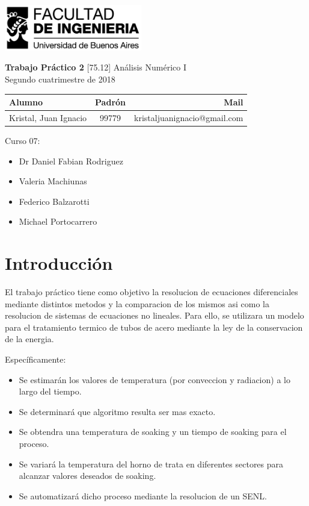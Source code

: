 \documentclass[11pt,a4paper]{article}
\begin{document}
\begin{titlepage}
	\hfill\includegraphics[width=6cm]{figuras/fiuba.jpg}
    \begin{center}
    \vfill
    \Huge \textbf{Trabajo Práctico 2}
    \vskip2cm
    \Large [75.12] Análisis Numérico I\\
    Segundo cuatrimestre de 2018
    \vfill
    \begin{tabular}{|l|c|r|}
	\hline
	Alumno & Padrón & Mail\\
	\hline
	\hline
	Kristal, Juan Ignacio & 99779 & kristaljuanignacio@gmail.com\\
	\hline
	\end{tabular}
    \vskip2cm
    \end{center}

    Curso 07:

    \begin{itemize}
    \item Dr Daniel Fabian Rodriguez
    \item Valeria Machiunas
    \item Federico Balzarotti
    \item Michael Portocarrero
    \end{itemize}

\end{titlepage}



\tableofcontents
\thispagestyle{onlyheader}
\newpage

\setcounter{page}{1}

\section{Introducción}
El trabajo práctico tiene como objetivo la resolucion de ecuaciones diferenciales mediante distintos metodos y la comparacion de los mismos asi como la resolucion de sistemas de ecuaciones no lineales. Para ello, se utilizara un modelo para el tratamiento termico de tubos de acero mediante la ley de la conservacion de la energia.

Específicamente:

\begin{itemize}
\item Se estimarán los valores de temperatura (por conveccion y radiacion) a lo largo del tiempo.
\item Se determinará que algoritmo resulta ser mas exacto.
\item Se obtendra una temperatura de soaking y un tiempo de soaking para el proceso.
\item Se variará la temperatura del horno de trata en diferentes sectores para alcanzar valores deseados de soaking.
\item Se automatizará dicho proceso mediante la resolucion de un SENL.
\end{itemize}
\end{document}
